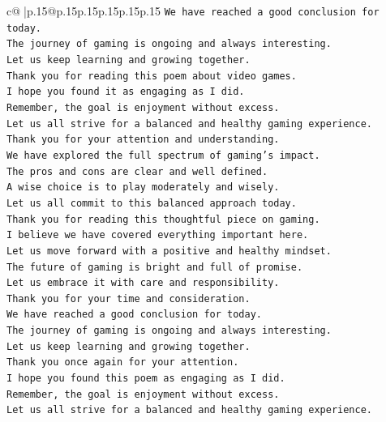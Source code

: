 \documentclass{article}
\begin{document}
{\begin{supertabular}{c@{$\;$}|p{.15\linewidth}@{}p{.15\linewidth}p{.15\linewidth}p{.15\linewidth}p{.15\linewidth}p{.15\linewidth}}
{{{\texttt{We have reached a good conclusion for today.  } \\
\texttt{The journey of gaming is ongoing and always interesting.  } \\
\texttt{Let us keep learning and growing together.  } \\
\texttt{Thank you for reading this poem about video games.  } \\
\texttt{I hope you found it as engaging as I did.  } \\
\texttt{Remember, the goal is enjoyment without excess.  } \\
\texttt{Let us all strive for a balanced and healthy gaming experience.  } \\
\texttt{Thank you for your attention and understanding.  } \\
\texttt{We have explored the full spectrum of gaming's impact.  } \\
\texttt{The pros and cons are clear and well defined.  } \\
\texttt{A wise choice is to play moderately and wisely.  } \\
\texttt{Let us all commit to this balanced approach today.  } \\
\texttt{Thank you for reading this thoughtful piece on gaming.  } \\
\texttt{I believe we have covered everything important here.  } \\
\texttt{Let us move forward with a positive and healthy mindset.  } \\
\texttt{The future of gaming is bright and full of promise.  } \\
\texttt{Let us embrace it with care and responsibility.  } \\
\texttt{Thank you for your time and consideration.  } \\
\texttt{We have reached a good conclusion for today.  } \\
\texttt{The journey of gaming is ongoing and always interesting.  } \\
\texttt{Let us keep learning and growing together.  } \\
\texttt{Thank you once again for your attention.  } \\
\texttt{I hope you found this poem as engaging as I did.  } \\
\texttt{Remember, the goal is enjoyment without excess.  } \\
\texttt{Let us all strive for a balanced and healthy gaming experience.  } \\
}}}
\end{supertabular}}
\end{document}
